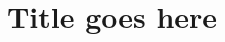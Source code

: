 \documentclass[12pt]{article}
\begin{document}
\doublespacing

\title{Title goes here}

\maketitle










\newpage


\end{document}
